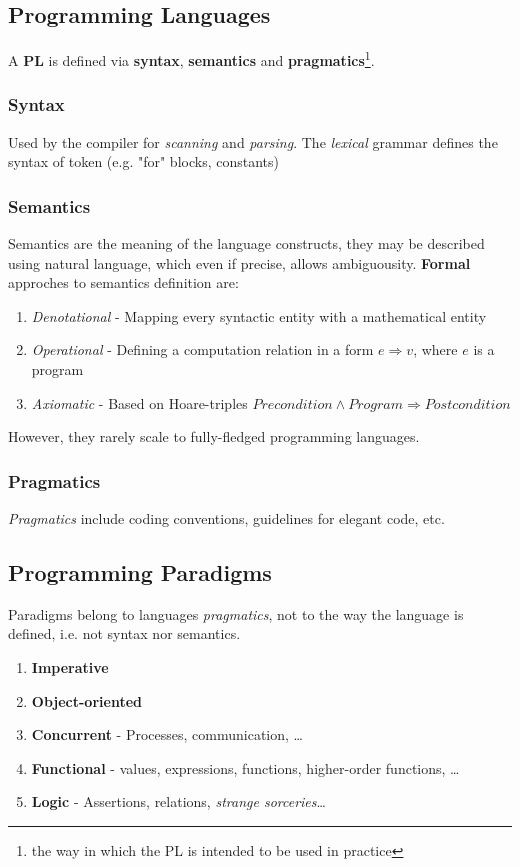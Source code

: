 \subsection{Programming Languages}
A \textbf{PL} is defined via \textbf{syntax}, \textbf{semantics} and \textbf{pragmatics}\footnote{the way in which the PL is intended to be used in practice}.
\subsubsection{Syntax}
Used by the compiler for \textit{scanning} and \textit{parsing}.
The \textit{lexical} grammar defines the syntax of token (e.g. "for" blocks, constants)
\subsubsection{Semantics}
Semantics are the meaning of the language constructs, they may be described using natural language, which even if precise, allows ambiguousity.
\textbf{Formal} approches to semantics definition are:
\begin{enumerate}
    \item \textit{Denotational} - Mapping every syntactic entity with a mathematical entity
    \item \textit{Operational} - Defining a computation relation in a form $e \Rightarrow v$, where $e$ is a program
    \item \textit{Axiomatic} - Based on Hoare-triples $\textit{Precondition} \wedge \textit{Program}\Rightarrow \textit{Postcondition}$ 
\end{enumerate}
However, they rarely scale to fully-fledged programming languages.
\subsubsection{Pragmatics}
\textit{Pragmatics} include coding conventions, guidelines for elegant code, etc.

\subsection{Programming Paradigms}
Paradigms belong to languages \textit{pragmatics}, not to the way the language is defined, i.e. not syntax nor semantics.
\begin{enumerate}
    \item \textbf{Imperative}
    \item \textbf{Object-oriented}
    \item \textbf{Concurrent} - Processes, communication, \dots 
    \item \textbf{Functional} - values, expressions,
    functions, higher-order functions, \dots
    \item \textbf{Logic} - Assertions, relations, \textit{strange sorceries}\dots 
\end{enumerate}

